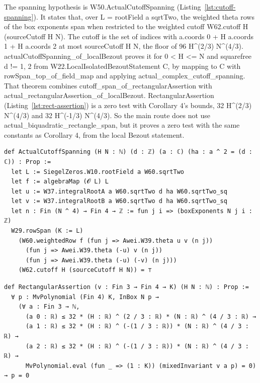 The spanning hypothesis is W50.ActualCutoffSpanning (Listing~\ref{lst:cutoff-spanning}).
It states that, over L = rootField a sqrtTwo, the weighted theta rows of the box exponents span when restricted to the weighted cutoff W62.cutoff H (sourceCutoff H N).
The cutoff is the set of indices with a.coords 0 + H a.coords 1 + H a.coords 2 at most sourceCutoff H N, the floor of 96 H\textasciicircum(2/3) N\textasciicircum(4/3).
actualCutoffSpanning\_of\_localBezout proves it for 0 < H <= N and squarefree d != 1, 2 from W22.LocalIsolatedBezoutStatement C, by mapping to C with rowSpan\_top\_of\_field\_map and applying actual\_complex\_cutoff\_spanning.
That theorem combines cutoff\_span\_of\_rectangularAssertion with actual\_rectangularAssertion\_of\_localBezout.
RectangularAssertion (Listing~\ref{lst:rect-assertion}) is a zero test with Corollary 4's bounds, 32 H\textasciicircum(2/3) N\textasciicircum(4/3) and 32 H\textasciicircum(-1/3) N\textasciicircum(4/3).
So the main route does not use actual\_biquadratic\_rectangle\_span, but it proves a zero test with the same constants as Corollary 4, from the local Bezout statement.

\begin{listing}[tbp]
\caption{The main route's spanning statement, OAI/\allowbreak NumberTheory/\allowbreak SiegelZeros/\allowbreak Structure/\allowbreak ArithmeticCutoffTransport.lean:356-366 (openai/math fd4aeeb).}\label{lst:cutoff-spanning}
\begin{Verbatim}
def ActualCutoffSpanning (H N : ℕ) (d : ℤ) (a : ℂ) (ha : a ^ 2 = (d : ℂ)) : Prop :=
  let L := SiegelZeros.W10.rootField a W60.sqrtTwo
  let f := algebraMap (𝓞 L) L
  let u := W37.integralRootA a W60.sqrtTwo d ha W60.sqrtTwo_sq
  let v := W37.integralRootB a W60.sqrtTwo d ha W60.sqrtTwo_sq
  let n : Fin (N ^ 4) → Fin 4 → ℤ := fun j i => (boxExponents N j i : ℤ)
  W29.rowSpan (K := L)
    (W60.weightedRow f (fun j => Awei.W39.theta u v (n j))
      (fun j => Awei.W39.theta (-u) v (n j))
      (fun j => Awei.W39.theta (-u) (-v) (n j)))
    (W62.cutoff H (sourceCutoff H N)) = ⊤
\end{Verbatim}
\end{listing}

\begin{listing}[tbp]
\caption{The zero test on the main route, OAI/\allowbreak NumberTheory/\allowbreak SiegelZeros/\allowbreak Determinants/\allowbreak RectangleDeterminant.lean:31-37 (openai/math fd4aeeb).}\label{lst:rect-assertion}
\begin{Verbatim}
def RectangularAssertion (v : Fin 3 → Fin 4 → K) (H N : ℕ) : Prop :=
  ∀ p : MvPolynomial (Fin 4) K, InBox N p →
    (∀ a : Fin 3 → ℕ,
      (a 0 : ℝ) ≤ 32 * (H : ℝ) ^ (2 / 3 : ℝ) * (N : ℝ) ^ (4 / 3 : ℝ) →
      (a 1 : ℝ) ≤ 32 * (H : ℝ) ^ (-(1 / 3 : ℝ)) * (N : ℝ) ^ (4 / 3 : ℝ) →
      (a 2 : ℝ) ≤ 32 * (H : ℝ) ^ (-(1 / 3 : ℝ)) * (N : ℝ) ^ (4 / 3 : ℝ) →
      MvPolynomial.eval (fun _ => (1 : K)) (mixedInvariant v a p) = 0) → p = 0
\end{Verbatim}
\end{listing}

